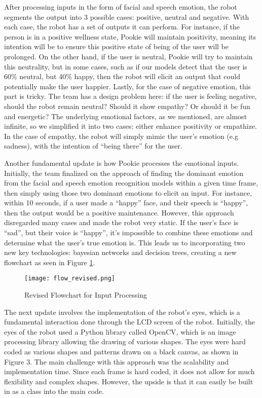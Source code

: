After processing inputs in the form of facial and speech emotion, the robot segments the output into 3 possible cases: positive, neutral and negative. With each case, the robot has a set of outputs it can perform. For instance, if the person is in a positive wellness state, Pookie will maintain positivity, meaning its intention will be to ensure this positive state of being of the user will be prolonged. On the other hand, if the user is neutral, Pookie will try to maintain this neutrality, but in some cases, such as if our models detect that the user is 60\% neutral, but 40\% happy, then the robot will elicit an output that could potentially make the user happier. Lastly, for the case of negative emotion, this part is tricky. The team has a design problem here: if the user is feeling negative, should the robot remain neutral? Should it show empathy? Or should it be fun and energetic? The underlying emotional factors, as we mentioned, are almost infinite, so we simplified it into two cases: either enhance positivity or empathize. In the case of empathy, the robot will simply mimic the user’s emotion (e.g sadness), with the intention of “being there” for the user. 

Another fundamental update is how Pookie processes the emotional inputs. Initially, the team finalized on the approach of finding the dominant emotion from the facial and speech emotion recognition models within a given time frame, then simply using those two dominant emotions to elicit an input. For instance, within 10 seconds, if a user made a “happy” face, and their speech is “happy”, then the output would be a positive maintenance. However, this approach disregarded many cases and made the robot very static. If the user’s face is “sad”, but their voice is “happy”, it’s impossible to combine these emotions and determine what the user’s true emotion is. This leads us to incorporating two new key technologies: bayesian networks and decision trees, creating a new flowchart as seen in Figure \ref{fig:rev_flow}.

\begin{figure}[ht]
    \centering
    \texttt{[image: flow\_revised.png]}
    \caption{Revised Flowchart for Input Processing}
    \label{fig:rev_flow}
\end{figure}

The next update involves the implementation of the robot’s eyes, which is a fundamental interaction done through the LCD screen of the robot. Initially, the eyes of the robot used a Python library called OpenCV, which is an image processing library allowing the drawing of various shapes. The eyes were hard coded as various shapes and patterns drawn on a black canvas, as shown in Figure 3. The main challenge with this approach was the scalability and implementation time. Since each frame is hard coded, it does not allow for much flexibility and complex shapes. However, the upside is that it can easily be built in as a class into the main code. 

